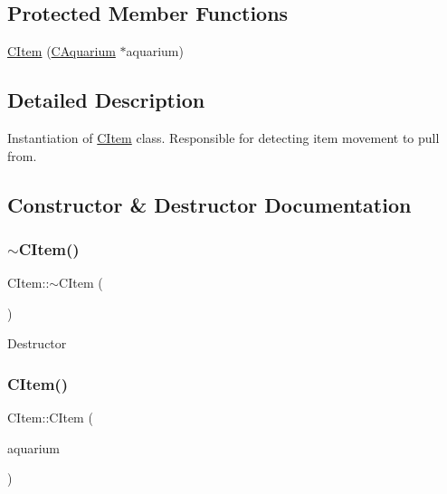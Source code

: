 \subsection*{Protected Member Functions}
\begin{DoxyCompactItemize}
\item 
\mbox{\hyperlink{class_c_item_a665b3fa4628b43e69b1d7f2b9529882b}{C\+Item}} (\mbox{\hyperlink{class_c_aquarium}{C\+Aquarium}} $\ast$aquarium)
\end{DoxyCompactItemize}


\subsection{Detailed Description}
Instantiation of \mbox{\hyperlink{class_c_item}{C\+Item}} class. Responsible for detecting item movement to pull from. 

\subsection{Constructor \& Destructor Documentation}
\mbox{\label{class_c_item_a2487c6e822ed0e850544f1745b43f584}} 
\subsubsection{\texorpdfstring{$\sim$\+C\+Item()}{~CItem()}}
{\footnotesize\ttfamily C\+Item\+::$\sim$\+C\+Item (\begin{DoxyParamCaption}{ }\end{DoxyParamCaption})\hspace{0.3cm}{\ttfamily [virtual]}}

Destructor \mbox{\label{class_c_item_a665b3fa4628b43e69b1d7f2b9529882b}} 
\subsubsection{\texorpdfstring{C\+Item()}{CItem()}}
{\footnotesize\ttfamily C\+Item\+::\+C\+Item (\begin{DoxyParamCaption}\item[{\mbox{\hyperlink{class_c_aquarium}{C\+Aquarium}} $\ast$}]{aquarium }\end{DoxyParamCaption})\hspace{0.3cm}{\ttfamily [protected]}}

